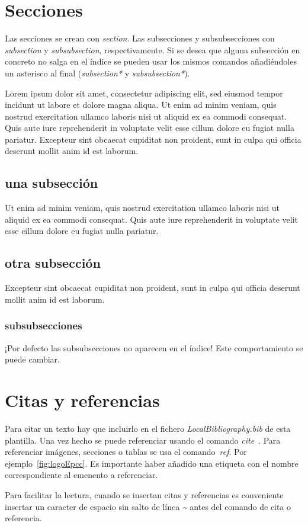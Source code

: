 \documentclass[12pt,a4paper,twoside]{book}
\begin{document}
\section{Secciones}
Las secciones se crean con \textit{section}. Las subsecciones y subsubsecciones
con \textit{subsection} y \textit{subsubsection}, respectivamente. Si se desea
que alguna subsección en concreto no salga en el índice se pueden usar los
mismos comandos añadiéndoles un asterisco al final (\textit{subsection*} y
\textit{subsubsection*}).
\par
Lorem ipsum dolor sit amet, consectetur adipiscing elit, sed eiusmod tempor incidunt ut labore et dolore magna aliqua. Ut enim ad minim veniam, quis nostrud exercitation ullamco laboris nisi ut aliquid ex ea commodi consequat. Quis aute iure reprehenderit in voluptate velit esse cillum dolore eu fugiat nulla pariatur. Excepteur sint obcaecat cupiditat non proident, sunt in culpa qui officia deserunt mollit anim id est laborum.
\subsection{una subsección}
Ut enim ad minim veniam, quis nostrud exercitation ullamco laboris nisi ut aliquid ex ea commodi consequat. Quis aute iure reprehenderit in voluptate velit esse cillum dolore eu fugiat nulla pariatur.
\subsection{otra subsección}
Excepteur sint obcaecat cupiditat non proident, sunt in culpa qui officia deserunt mollit anim id est laborum.
\subsubsection{subsubsecciones}
¡Por defecto las subsubsecciones no aparecen en el índice! Este comportamiento se
puede cambiar.

\section{Citas y referencias}
Para citar un texto hay que incluirlo en el fichero \textit{LocalBibliography.bib} de esta plantilla. Una vez hecho se puede referenciar usando el comando \textit{cite}~\cite{LaTeX_tutorials}.
Para referenciar imágenes, secciones o tablas se usa el comando~\textit{ref}. Por ejemplo~\ref{fig:logoEpcc}. Es importante haber añadido una etiqueta con el nombre correspondiente al emenento a referenciar.
\par
Para facilitar la lectura, cuando se insertan citas y referencias es conveniente insertar un caracter de espacio sin salto de línea \textit{\~} antes del comando de cita o referencia.
\end{document}
